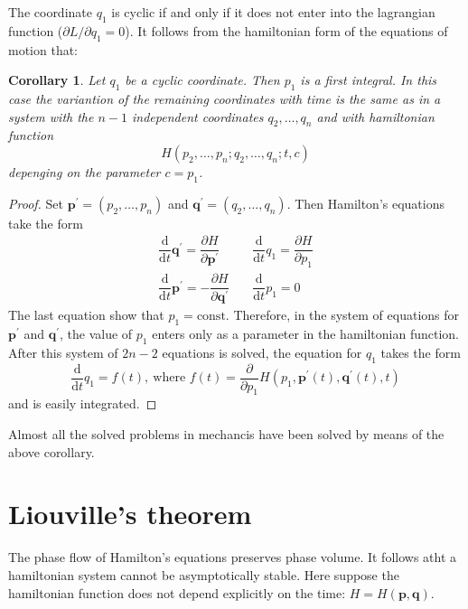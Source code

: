 \documentclass[conference]{IEEEtran}
\newtheorem{corollary}{Corollary}
\theoremstyle{definition}
\theoremstyle{remark}
\begin{document}
    The coordinate $q_1$ is cyclic if and only if it does not enter into the lagrangian function ($\partial L / \partial q_1 = 0$). It follows from the hamiltonian form of the equations of motion that:

    \begin{corollary}
        Let $q_1$ be a cyclic coordinate. Then $p_1$ is a first integral. In this case the variantion of the remaining coordinates with time is the same as in a system with the $n-1$ independent coordinates $q_2, \dots, q_n$ and with hamiltonian function
        \begin{equation*}
            H(p_2, \dots, p_n; q_2, \dots, q_n; t, c)
        \end{equation*}
        depenging on the parameter $c = p_1$.
    \end{corollary}

    \begin{proof}
        Set $\mathbf{p}^\prime = (p_2, \dots, p_n)$ and $\mathbf{q}^\prime = (q_2, \dots, q_n)$. Then Hamilton's equations take the form
        \begin{align*}
            \dfrac{\mathrm{d}}{\mathrm{d} t} \mathbf{q}^\prime = \dfrac{\partial H}{\partial \mathbf{p}^\prime} \quad & \dfrac{\mathrm{d}}{\mathrm{d} t} q_1 = \dfrac{\partial H}{\partial p_1} \\
            \dfrac{\mathrm{d}}{\mathrm{d} t} \mathbf{p}^\prime = -\dfrac{\partial H}{\partial \mathbf{q}^\prime} \quad & \dfrac{\mathrm{d}}{\mathrm{d} t} p_1 = 0
        \end{align*}
        The last equation show that $p_1 = \text{const}$. Therefore, in the system of equations for $\mathbf{p}^\prime$ and $\mathbf{q}^\prime$, the value of $p_1$ enters only as a parameter in the hamiltonian function. After this system of $2n-2$ equations is solved, the equation for $q_1$ takes the form
        \begin{equation*}
            \dfrac{\mathrm{d}}{\mathrm{d} t} q_1 = f(t),\ \text{where } f(t) = \dfrac{\partial}{\partial p_1}H(p_1, \mathbf{p}^\prime (t), \mathbf{q}^\prime(t), t)
        \end{equation*}
        and is easily integrated.
    \end{proof}

    Almost all the solved problems in mechancis have been solved by means of the above corollary.

    \section{Liouville's theorem}
    The phase flow of Hamilton's equations preserves phase volume. It follows atht a hamiltonian system cannot be asymptotically stable. Here suppose the hamiltonian function does not depend explicitly on the time: $H = H(\mathbf{p}, \mathbf{q})$.
\end{document}
